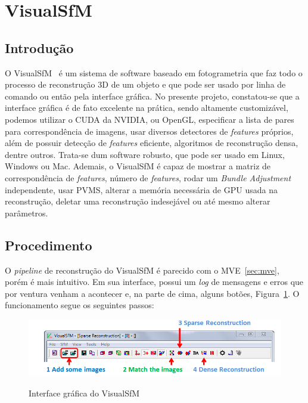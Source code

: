 \doublespacing
\section{VisualSfM}\label{sec:visualsfm}
%
\doublespacing
\subsection{Introdução}

O VisualSfM~\cite{wu2011visualsfm} é um sistema de software baseado em fotogrametria
que faz todo o processo de reconstrução 3D de um objeto e que pode ser usado por
linha de comando ou então pela interface gráfica. No presente projeto, constatou-se
que a interface gráfica é de fato excelente na prática, sendo
altamente customizável, podemos utilizar o CUDA da NVIDIA, ou OpenGL,
especificar a lista de pares para correspondência de imagens, usar diversos detectores de
\emph{features} próprios, além de possuir detecção de \emph{features} eficiente, 
algoritmos de reconstrução densa, dentre outros. Trata-se dum software
robusto, que pode ser usado em Linux, Windows ou Mac.
Ademais, o VisualSfM é capaz de mostrar a matriz de correspondência de
\emph{features}, número de \emph{features}, rodar um \emph{Bundle Adjustment}
independente, usar PVMS, alterar a memória necessária de GPU usada na
reconstrução, deletar uma reconstrução indesejável ou até mesmo alterar
parâmetros.

\subsection{Procedimento}

O \emph{pipeline} de reconstrução do VisualSfM é parecido com o MVE~\ref{sec:mve}, porém é mais
intuitivo. Em sua interface, possui um \emph{log} de mensagens e erros que por ventura
venham a acontecer e, na parte de cima, alguns botões,
Figura~\ref{fig:pipelineVisualSfM}. O funcionamento segue os seguintes passos:

\begin{figure}[!h]
	\centering
  \caption{Interface gráfica do VisualSfM}
	\includegraphics[width=0.7\linewidth]{figs/pipelinevisualsfm.png}
   \label{fig:pipelineVisualSfM}
\end{figure}

